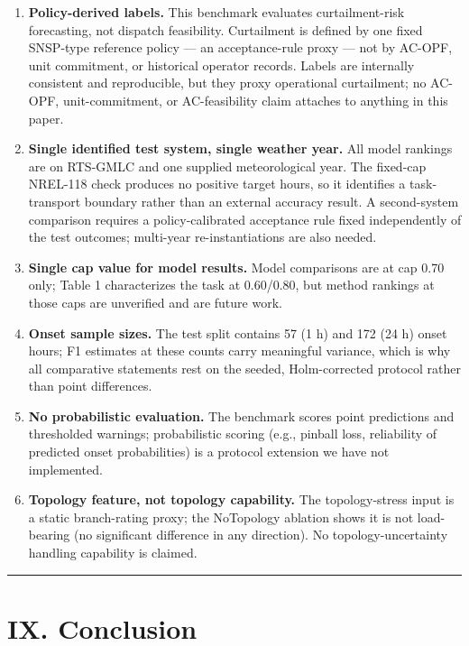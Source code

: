 \documentclass[
  10pt,
  a4paper,
]{article}
\providecommand{\tightlist}{%
  \setlength{\itemsep}{0pt}\setlength{\parskip}{0pt}}
\begin{document}
\begin{enumerate}
\def\labelenumi{\arabic{enumi}.}
\tightlist
\item
  \textbf{Policy-derived labels.} This benchmark evaluates
  curtailment-risk forecasting, not dispatch feasibility. Curtailment is
  defined by one fixed SNSP-type reference policy --- an acceptance-rule
  proxy --- not by AC-OPF, unit commitment, or historical operator
  records. Labels are internally consistent and reproducible, but they
  proxy operational curtailment; no AC-OPF, unit-commitment, or
  AC-feasibility claim attaches to anything in this paper.
\item
  \textbf{Single identified test system, single weather year.} All model
  rankings are on RTS-GMLC and one supplied meteorological year. The
  fixed-cap NREL-118 check produces no positive target hours, so it
  identifies a task-transport boundary rather than an external accuracy
  result. A second-system comparison requires a policy-calibrated
  acceptance rule fixed independently of the test outcomes; multi-year
  re-instantiations are also needed.
\item
  \textbf{Single cap value for model results.} Model comparisons are at
  cap 0.70 only; Table 1 characterizes the task at 0.60/0.80, but method
  rankings at those caps are unverified and are future work.
\item
  \textbf{Onset sample sizes.} The test split contains 57 (1 h) and 172
  (24 h) onset hours; F1 estimates at these counts carry meaningful
  variance, which is why all comparative statements rest on the seeded,
  Holm-corrected protocol rather than point differences.
\item
  \textbf{No probabilistic evaluation.} The benchmark scores point
  predictions and thresholded warnings; probabilistic scoring (e.g.,
  pinball loss, reliability of predicted onset probabilities) is a
  protocol extension we have not implemented.
\item
  \textbf{Topology feature, not topology capability.} The
  topology-stress input is a static branch-rating proxy; the NoTopology
  ablation shows it is not load-bearing (no significant difference in
  any direction). No topology-uncertainty handling capability is
  claimed.
\end{enumerate}

\begin{center}\rule{0.5\linewidth}{0.5pt}\end{center}

\section{IX. Conclusion}\label{ix.-conclusion}
\end{document}
